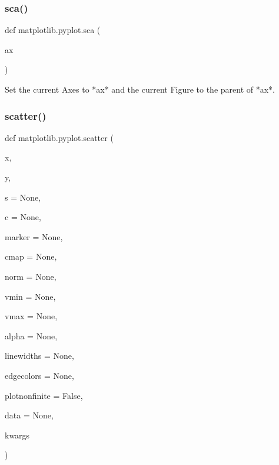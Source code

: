 \mbox{\label{namespacematplotlib_1_1pyplot_abecf10b61b1d74f1f42b64043c7a6624}} 
\subsubsection{\texorpdfstring{sca()}{sca()}}
{\footnotesize\ttfamily def matplotlib.\+pyplot.\+sca (\begin{DoxyParamCaption}\item[{}]{ax }\end{DoxyParamCaption})}

\begin{DoxyVerb}Set the current Axes to *ax* and the current Figure to the parent of *ax*.
\end{DoxyVerb}
 \mbox{\label{namespacematplotlib_1_1pyplot_aad672b36d4106396e90d49c74858631a}} 
\subsubsection{\texorpdfstring{scatter()}{scatter()}}
{\footnotesize\ttfamily def matplotlib.\+pyplot.\+scatter (\begin{DoxyParamCaption}\item[{}]{x,  }\item[{}]{y,  }\item[{}]{s = {\ttfamily None},  }\item[{}]{c = {\ttfamily None},  }\item[{}]{marker = {\ttfamily None},  }\item[{}]{cmap = {\ttfamily None},  }\item[{}]{norm = {\ttfamily None},  }\item[{}]{vmin = {\ttfamily None},  }\item[{}]{vmax = {\ttfamily None},  }\item[{}]{alpha = {\ttfamily None},  }\item[{}]{linewidths = {\ttfamily None},  }\item[{}]{edgecolors = {\ttfamily None},  }\item[{}]{plotnonfinite = {\ttfamily False},  }\item[{}]{data = {\ttfamily None},  }\item[{}]{kwargs }\end{DoxyParamCaption})}

